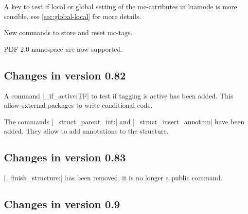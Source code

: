 \documentclass[DIV=12,parskip=half-,bibliography=totoc]{scrartcl}
\begin{document}
A key to test if local or global setting of the mc-attributes in luamode is more sensible, see \ref{sec:global-local} for more details.

New commands to store and reset mc-tags.

PDF 2.0 namespace are now supported.

\subsection{Changes in version 0.82}

A command |\tag_if_active:TF| to test if tagging is active has been added. This allow external packages to write conditional code.

The commands |\tag_struct_parent_int:| and |\tag_struct_insert_annot:nn| have been added. They allow to
add annotations to the structure.


\subsection{Changes in version 0.83}

|\tag_finish_structure:| has been removed, it is no longer a public command.

\subsection{Changes in version 0.9}
\end{document}
